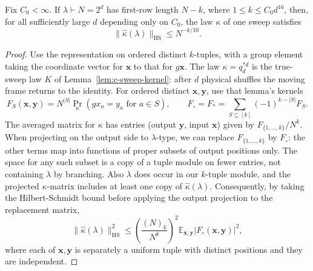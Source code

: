 \label{c:rep:sparse-proof}
\begin{proposition}
\label{c:rep:sparse}
Fix $C_0<\infty$. If $\lambda\vdash N=2^d$ has first-row length
$N-k$, where $1\le k\le C_0d^{16}$, then, for all sufficiently large
$d$ depending only on $C_0$, the law $\kappa$ of one sweep satisfies
\begin{equation}
\|\widehat\kappa(\lambda)\|_{\mathrm{HS}}\le N^{-k/10}.                \label{c:rep:e9}
\end{equation}
\end{proposition}
\begin{proof}
Use the representation on ordered distinct \(k\)-tuples, with a group element taking the
coordinate vector for \(\boldsymbol x\) to that for \(g\boldsymbol x\).
The law $\kappa=q_d^{*d}$ is the true-sweep law $K$ of
Lemma~\ref{lem:c-sweep-kernel}: after $d$ physical shuffles the moving
frame returns to the identity. For ordered distinct
\(\boldsymbol x,\boldsymbol y\), use that lemma's kernels
\[
F_S(\boldsymbol x,\boldsymbol y)=N^{|S|}\Pr_\kappa(g x_a=y_a\text{ for }a\in S),
\qquad
F_\circ=F_*=\sum_{S\subseteq[k]}(-1)^{k-|S|}F_S.
\]
The averaged matrix for \(\kappa\) has entries (output
\(\boldsymbol y\), input \(\boldsymbol x\)) given by \(F_{\{1,\ldots,k\}}/N^k\). When
projecting on the output side to \(\lambda\)-type, we can replace \(F_{\{1,\ldots,k\}}\) by
\(F_\circ\): the other terms map into functions of proper subsets of output positions only. The
space for any such subset is a copy of a tuple module on fewer entries, not containing
\(\lambda\) by branching. Also \(\lambda\) does occur in our \(k\)-tuple module, and the
projected \(\kappa\)-matrix includes at least one copy of \(\widehat\kappa(\lambda)\).
Consequently, by taking the Hilbert-Schmidt bound before applying the output projection to the
replacement matrix,
\begin{equation}
\|\widehat\kappa(\lambda)\|_{\mathrm{HS}}^2
\le \left(\frac{(N)_k}{N^k}\right)^2 \mathbb E_{\boldsymbol x,\boldsymbol y}
                       \left|F_\circ(\boldsymbol x,\boldsymbol y)\right|^2,   \label{c:rep:e10}
\end{equation}
where each of \(\boldsymbol x,\boldsymbol y\) is separately a uniform tuple with distinct
positions and they are independent.


\end{proof}
